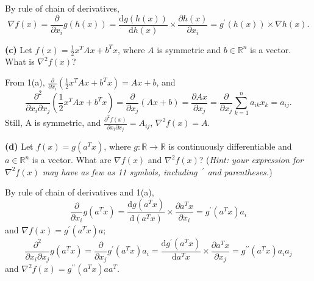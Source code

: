 \documentclass[11pt]{article}
\renewcommand\part[1]{\vspace{.10in}\textbf{(#1)  }}
\begin{document}
By rule of chain of derivatives, $$\nabla f(x) = \frac{\partial}{\partial x_i} g(h(x)) = \frac{\text{d}g(h(x))}{\text{d}h(x)}\times \frac{\partial h(x)}{\partial x_i} = g^\prime(h(x))\times \nabla h(x).$$

\part{c}Let $f(x)=\frac{1}{2}x^TAx + b^Tx$, where $A$ is symmetric and $b\in \mathbb{R}^n$ is a vector. What is $\nabla^2 f(x)$?

From 1(a), $\frac{\partial}{\partial x_i}\left(\frac{1}{2}x^TAx + b^Tx\right) = Ax+b$, and $$\frac{\partial^2}{\partial x_i\partial x_j}\left(\frac{1}{2}x^TAx + b^Tx\right) = \frac{\partial}{\partial x_j}(Ax+b)= \frac{\partial Ax}{\partial x_j} = \frac{\partial}{\partial x_j}\sum_{k=1}^{n}a_{ik}x_k = a_{ij}.$$
Still, A is symmetric, and $\frac{\partial^2f(x)}{\partial x_i\partial x_j} = A_{ij}$, $\nabla^2 f(x) = A$.

\part{d}Let $f(x)=g(a^Tx)$, where $g: \mathbb{R} \rightarrow \mathbb{R}$ is continuously differentiable and $a\in \mathbb{R}^n$ is a vector. What are $\nabla f(x)$ and $\nabla^2 f(x)$? (\textit{Hint: your expression for $\nabla^2 f(x)$ may have as few as 11 symbols, including $~^\prime$ and parentheses.})

By rule of chain of derivatives and 1(a), $$\frac{\partial}{\partial x_i} g(a^Tx) = \frac{\text{d}g(a^Tx)}{\text{d}(a^Tx)}\times \frac{\partial a^Tx}{\partial x_i} = g^{\prime}(a^Tx)a_i$$
and $\nabla f(x) = g^{\prime}(a^Tx)a;$
$$\frac{\partial^2}{\partial x_i \partial x_j} g(a^Tx) = \frac{\partial}{\partial x_j}g^{\prime}(a^Tx)a_i = \frac{\text{d}g^\prime (a^Tx)}{\text{d}a^Tx}\times \frac{\partial a^Tx}{\partial x_j} = g^{\prime\prime}(a^Tx)a_ia_j$$
and $\nabla^2 f(x) = g^{\prime\prime}(a^Tx)aa^T.$
\end{document}
